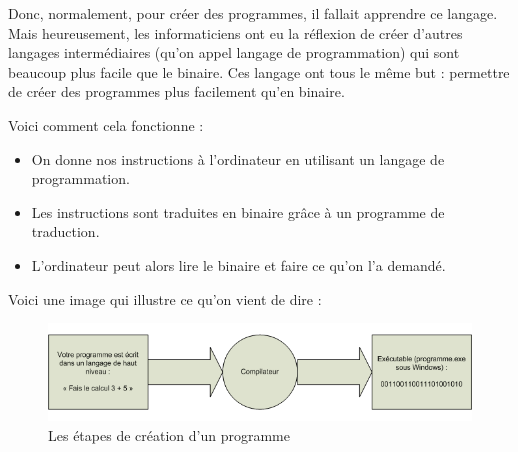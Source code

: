 \documentclass[12pt]{article}
\begin{document}
            Donc, normalement, pour créer des programmes, il fallait apprendre ce langage.
            Mais heureusement, les informaticiens ont eu la réflexion de créer d'autres langages intermédiaires 
            (qu'on appel langage de programmation) qui sont beaucoup plus facile que le binaire. Ces langage ont 
            tous le même but : permettre de créer des programmes plus facilement qu'en binaire.
            
            Voici comment cela fonctionne :
            \begin{itemize}
                \item On donne nos instructions à l'ordinateur en utilisant un langage de programmation.
                \item Les instructions sont traduites en binaire grâce à un programme de traduction.
                \item L'ordinateur peut alors lire le binaire et faire ce qu'on l'a demandé.
            \end{itemize}

            Voici une image qui illustre ce qu'on vient de dire :
            \begin{figure}[H]
                \centering
                \includegraphics[width=\linewidth]{img/11_compilation.png}
                \caption{Les étapes de création d'un programme}
            \end{figure}

\end{document}
